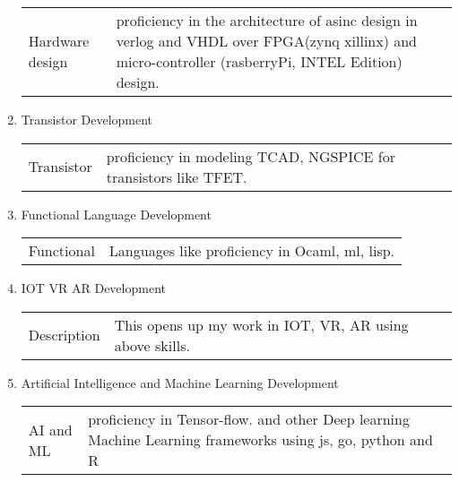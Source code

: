 \documentclass[letterpaper,11pt]{article}
\begin{document}
\begin{enumerate}
\begin{center}
	\begin{tabular}{p{5cm} p{11cm} }
		Hardware design & proficiency in the architecture of asinc design in verlog and VHDL over FPGA(zynq xillinx) and micro-controller (rasberryPi, INTEL Edition) design.\\
	\end{tabular}
 \end{center}
\item Transistor Development\\
 \begin{center}
	\begin{tabular}{p{5cm} p{11cm} }
		Transistor& proficiency in modeling TCAD, NGSPICE for transistors like TFET.\\ 
	\end{tabular}
 \end{center}
\item Functional Language Development\\
 \begin{center}
	\begin{tabular}{p{5cm} p{11cm} }
		Functional& Languages like proficiency in Ocaml, ml, lisp.\\
	\end{tabular}
 \end{center}
\item IOT VR AR Development\\
 \begin{center}
	\begin{tabular}{p{5cm} p{11cm} }
		Description & This opens up my work in IOT, VR, AR using above skills.\\
	\end{tabular}
 \end{center}
\item Artificial Intelligence and Machine Learning Development\\
 \begin{center}
	\begin{tabular}{p{5cm} p{11cm} }
		AI and ML& proficiency in Tensor-flow. and other Deep learning Machine Learning frameworks using js, go, python and R\\
	\end{tabular}
 \end{center}
\end{enumerate}
\end{document}
